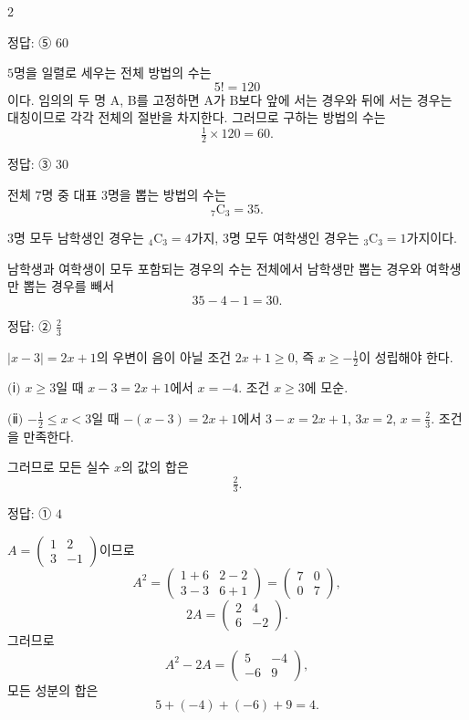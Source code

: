 \documentclass[10pt]{article}
\begin{document}
\raggedcolumns
\begin{multicols}{2}

\begin{answerbox}정답: ⑤ $60$\end{answerbox}

$5$명을 일렬로 세우는 전체 방법의 수는
\[ 5! = 120 \]
이다. 임의의 두 명 A, B를 고정하면 A가 B보다 앞에 서는 경우와 뒤에 서는 경우는 대칭이므로 각각 전체의 절반을 차지한다. 그러므로 구하는 방법의 수는
\[ \tfrac{1}{2} \times 120 = 60. \]

\begin{answerbox}정답: ③ $30$\end{answerbox}

전체 $7$명 중 대표 $3$명을 뽑는 방법의 수는
\[ {}_7\mathrm{C}_3 = 35. \]

$3$명 모두 남학생인 경우는 ${}_4\mathrm{C}_3 = 4$가지, $3$명 모두 여학생인 경우는 ${}_3\mathrm{C}_3 = 1$가지이다.

남학생과 여학생이 모두 포함되는 경우의 수는 전체에서 남학생만 뽑는 경우와 여학생만 뽑는 경우를 빼서
\[ 35 - 4 - 1 = 30. \]

\begin{answerbox}정답: ② $\tfrac{2}{3}$\end{answerbox}

$|x - 3| = 2x + 1$의 우변이 음이 아닐 조건 $2x + 1 \ge 0$, 즉 $x \ge -\tfrac{1}{2}$이 성립해야 한다.

$(\!$ⅰ$)$ $x \ge 3$일 때 $x - 3 = 2x + 1$에서 $x = -4$. 조건 $x \ge 3$에 모순.

$(\!$ⅱ$)$ $-\tfrac{1}{2} \le x < 3$일 때 $-(x - 3) = 2x + 1$에서 $3 - x = 2x + 1$, $3x = 2$, $x = \tfrac{2}{3}$. 조건을 만족한다.

그러므로 모든 실수 $x$의 값의 합은
\[ \tfrac{2}{3}. \]

\begin{answerbox}정답: ① $4$\end{answerbox}

$A = \begin{pmatrix} 1 & 2 \\ 3 & -1 \end{pmatrix}$이므로
\[ A^2 = \begin{pmatrix} 1 + 6 & 2 - 2 \\ 3 - 3 & 6 + 1 \end{pmatrix} = \begin{pmatrix} 7 & 0 \\ 0 & 7 \end{pmatrix}, \]
\[ 2A = \begin{pmatrix} 2 & 4 \\ 6 & -2 \end{pmatrix}. \]
그러므로
\[ A^2 - 2A = \begin{pmatrix} 5 & -4 \\ -6 & 9 \end{pmatrix}, \]
모든 성분의 합은
\[ 5 + (-4) + (-6) + 9 = 4. \]


\end{multicols}
\end{document}
